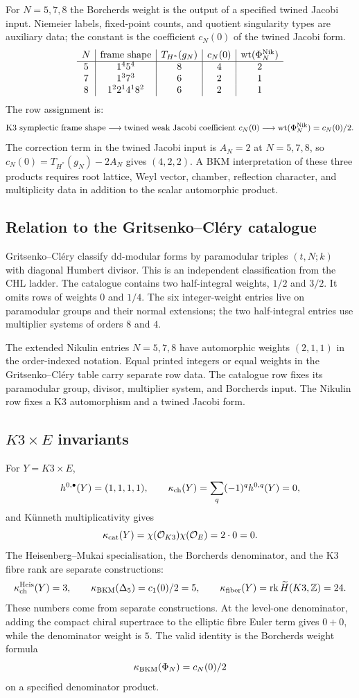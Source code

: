 For $N=5,7,8$ the Borcherds weight is the output of a specified
twined Jacobi input. Niemeier labels, fixed-point counts, and quotient
singularity types are auxiliary data; the constant is the coefficient
$c_N(0)$ of the twined Jacobi form.
\[
\begin{array}{c|c|c|c|c}
N & \text{frame shape} & T_{H^*}(g_N) & c_N(0) &
\operatorname{wt}(\Phi_N^{\mathrm{Nik}}) \\ \hline
5 & 1^4 5^4 & 8 & 4 & 2 \\
7 & 1^3 7^3 & 6 & 2 & 1 \\
8 & 1^2 2^1 4^1 8^2 & 6 & 2 & 1
\end{array}
\]
The row assignment is:
\[
  \text{K3 symplectic frame shape}
  \longrightarrow
  \text{twined weak Jacobi coefficient }c_N(0)
  \longrightarrow
  \operatorname{wt}(\Phi_N^{\mathrm{Nik}})=c_N(0)/2.
\]
The correction term in the twined Jacobi input is $A_N=2$ at
$N=5,7,8$, so $c_N(0)=T_{H^*}(g_N)-2A_N$ gives $(4,2,2)$. A BKM
interpretation of these three products requires root lattice, Weyl
vector, chamber, reflection character, and multiplicity data in
addition to the scalar automorphic product.

\subsection*{Relation to the Gritsenko--Cl\'ery catalogue}

Gritsenko--Cl\'ery classify dd-modular forms by paramodular triples
$(t,N;k)$ with diagonal Humbert divisor. This is an independent
classification from the CHL ladder. The catalogue contains two
half-integral weights, $1/2$ and $3/2$. It omits rows of weights $0$
and $1/4$. The six integer-weight entries live on paramodular
groups and their normal extensions; the two half-integral entries use
multiplier systems of orders $8$ and $4$.

The extended Nikulin entries $N=5,7,8$ have automorphic weights
$(2,1,1)$ in the order-indexed notation. Equal printed integers or
equal weights in the Gritsenko--Cl\'ery table carry separate row data.
The catalogue row fixes its paramodular group, divisor, multiplier
system, and Borcherds input. The Nikulin row fixes a K3 automorphism
and a twined Jacobi form.

\subsection*{\texorpdfstring{$K3\times E$}{K3 x E} invariants}

For $Y=K3\times E$,
\[
  h^{0,\bullet}(Y)=(1,1,1,1),
  \qquad
  \kappa_{\mathrm{ch}}(Y)=\sum_q(-1)^q h^{0,q}(Y)=0,
\]
and K\"unneth multiplicativity gives
\[
  \kappa_{\mathrm{cat}}(Y)=\chi(\mathcal O_{K3})\chi(\mathcal O_E)=2\cdot0=0.
\]
The Heisenberg--Mukai specialisation, the Borcherds denominator, and
the K3 fibre rank are separate constructions:
\[
  \kappa_{\mathrm{ch}}^{\mathrm{Heis}}(Y)=3,\qquad
  \kappa_{\mathrm{BKM}}(\Delta_5)=c_1(0)/2=5,\qquad
  \kappa_{\mathrm{fiber}}(Y)=\operatorname{rk}\widetilde H(K3,\mathbb Z)=24.
\]
These numbers come from separate constructions. At the level-one denominator,
adding the compact chiral supertrace to the elliptic fibre Euler term
gives $0+0$, while the denominator weight is $5$. The valid identity is
the Borcherds weight formula
\[
  \kappa_{\mathrm{BKM}}(\Phi_N)=c_N(0)/2
\]
on a specified denominator product.

